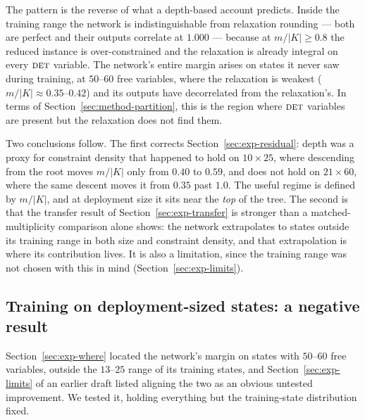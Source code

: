 \documentclass[preprint,12pt]{elsarticle}
\newcommand{\FORCED}{\textsc{det}}
\begin{document}
The pattern is the reverse of what a depth-based account predicts. Inside the training range the network is indistinguishable from relaxation rounding --- both are perfect and their outputs correlate at $1.000$ --- because at $m/|K|\ge0.8$ the reduced instance is over-constrained and the relaxation is already integral on every $\FORCED$ variable. The network's entire margin arises on states it never saw during training, at $50$--$60$ free variables, where the relaxation is weakest ($m/|K|\approx0.35$--$0.42$) and its outputs have decorrelated from the relaxation's. In terms of Section~\ref{sec:method-partition}, this is the region where $\FORCED$ variables are present but the relaxation does not find them.

Two conclusions follow. The first corrects Section~\ref{sec:exp-residual}: depth was a proxy for constraint density that happened to hold on $10\times25$, where descending from the root moves $m/|K|$ only from $0.40$ to $0.59$, and does not hold on $21\times60$, where the same descent moves it from $0.35$ past $1.0$. The useful regime is defined by $m/|K|$, and at deployment size it sits near the \emph{top} of the tree. The second is that the transfer result of Section~\ref{sec:exp-transfer} is stronger than a matched-multiplicity comparison alone shows: the network extrapolates to states outside its training range in both size and constraint density, and that extrapolation is where its contribution lives. It is also a limitation, since the training range was not chosen with this in mind (Section~\ref{sec:exp-limits}).

\subsection{Training on deployment-sized states: a negative result}
\label{sec:exp-range}

Section~\ref{sec:exp-where} located the network's margin on states with $50$--$60$ free variables, outside the $13$--$25$ range of its training states, and Section~\ref{sec:exp-limits} of an earlier draft listed aligning the two as an obvious untested improvement. We tested it, holding everything but the training-state distribution fixed.
\end{document}
